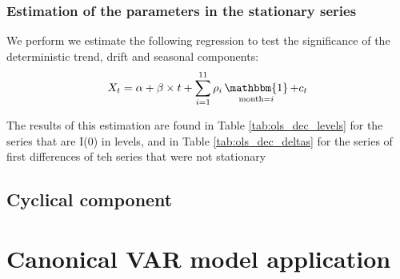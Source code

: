 \documentclass[hidelinks,12pts]{article}
\DeclareMathOperator{\1}{\mathbbm{1}}
\begin{document}
    \subsubsection{Estimation of the parameters in the stationary series}

We perform we estimate the following regression to test the significance of the deterministic trend, drift and seasonal components:
    \begin{equation*}
        X_t = \alpha + \beta \times t + \sum_{i=1}^{11} \rho_i \1_{\text{month}=i} +c_t
    \end{equation*}

The results of this estimation are found in Table \ref{tab:ols_dec_levels} for the series that are I(0) in levels, and in Table \ref{tab:ols_dec_deltas} for the series of first differences of teh series that were not stationary 

    \subsection{Cyclical component}








\section{Canonical VAR model application}\label{sec:var}




\end{document}
